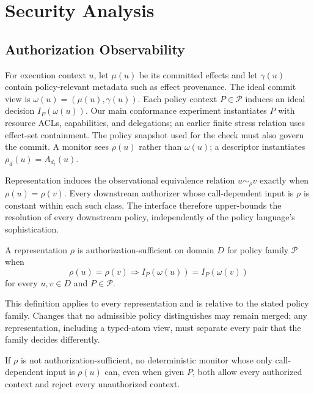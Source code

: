 \section{Security Analysis}
\label{sec:security-analysis}

\subsection{Authorization Observability}

For execution context $u$, let $\mu(u)$ be its committed effects and let
$\gamma(u)$ contain policy-relevant metadata such as effect provenance.  The
ideal commit view is $\omega(u)=(\mu(u),\gamma(u))$.  Each policy context
$P\in\mathcal P$ induces an ideal decision $I_P(\omega(u))$.  Our main
conformance experiment instantiates $P$ with resource ACLs, capabilities, and
delegations; an earlier finite stress relation uses effect-set containment.
The policy snapshot used for the check must also govern the commit.  A monitor
sees $\rho(u)$ rather than $\omega(u)$; a descriptor instantiates
$\rho_d(u)=A_{d_t}(u)$.

Representation induces the observational equivalence relation
$u\sim_\rho v$ exactly when $\rho(u)=\rho(v)$.  Every downstream authorizer
whose call-dependent input is $\rho$ is constant within each such class.  The
interface therefore upper-bounds the resolution of every downstream policy,
independently of the policy language's sophistication.

\begin{definition}
\label{def:authorization-equivalence}
A representation $\rho$ is authorization-sufficient on domain $D$ for policy
family $\mathcal P$ when
\[
 \rho(u)=\rho(v) \Longrightarrow
 I_P(\omega(u))=I_P(\omega(v))
\]
for every $u,v\in D$ and $P\in\mathcal P$.
\end{definition}

This definition applies to every representation and is relative to the stated
policy family. Changes that no admissible policy distinguishes may remain
merged; any representation, including a typed-atom view, must separate every
pair that the family decides differently.

\begin{theorem}
\label{thm:representation-insufficiency}
If $\rho$ is not authorization-sufficient, no deterministic monitor whose only
call-dependent input is $\rho(u)$ can, even when given $P$, both allow every
authorized context and reject every unauthorized context.
\end{theorem}

